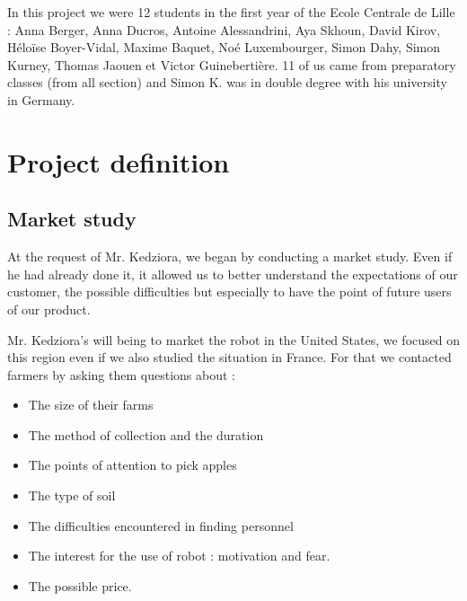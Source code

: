 \documentclass[oneside]{book}
\begin{document}
\hspace{\parindent} In this project we were 12 students in the first year of the Ecole Centrale de Lille : Anna Berger, Anna Ducros, Antoine Alessandrini, Aya Skhoun, David Kirov, Héloïse Boyer-Vidal, Maxime Baquet, Noé Luxembourger, Simon Dahy, Simon Kurney, Thomas Jaouen et Victor Guinebertière. 11 of us came from preparatory classes (from all section) and Simon K. was in double degree with his university in Germany. 

\chapter{Project definition}
\section{Market study}

\hspace{\parindent} At the request of Mr. Kedziora, we began by conducting a market study. Even if he had already done it, it allowed us to better understand the expectations of our customer, the possible difficulties but especially to have the point of future users of our product.

\bigbreak

Mr. Kedziora's will being to market the robot in the United States, we focused on this region even if we also studied the situation in France. For that we contacted farmers by asking them questions about : 
\begin{itemize}[noitemsep]
    \item The size of their farms
    \item The method of collection and the duration
    \item The points of attention to pick apples
    \item The type of soil
    \item The difficulties encountered in finding personnel
    \item The interest for the use of robot : motivation and fear.
    \item The possible price.
\end{itemize}
\end{document}
